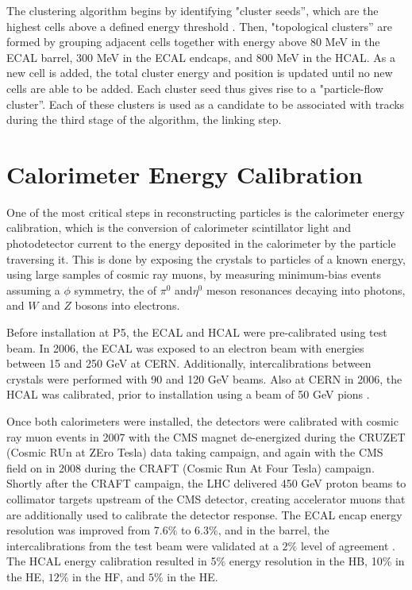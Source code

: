 \par The clustering algorithm begins by identifying "cluster seeds'',
which are the highest \PT cells above a defined energy threshold
\cite{CMS-PAS-PFT-09-001}.  Then, "topological clusters'' are formed
by grouping adjacent cells together with energy above 80 MeV in the
ECAL barrel, 300 MeV in the ECAL endcaps, and 800 MeV in the HCAL.
As a new cell is added, the total cluster energy and position is
updated until no new cells are able to be added.  Each cluster seed
thus gives rise to a "particle-flow cluster''.  Each of these clusters
is used as a candidate to be associated with tracks during the third
stage of the algorithm, the linking step.  


\section{Calorimeter Energy Calibration}
\label{energy_calibration_overview}

\par One of the most critical steps in reconstructing particles is the
calorimeter energy calibration, which is the conversion of calorimeter
scintillator light and photodetector current to the energy deposited
in the calorimeter by the particle traversing it.  This is done by
exposing the crystals to particles of a known energy, using large
samples of cosmic ray muons, by measuring minimum-bias events assuming
a $\phi$ symmetry, the of $\pi^{0}$ and$\eta^{0}$ meson resonances
decaying into photons, and $W$ and $Z$ bosons into electrons.   

\par Before installation at P5, the ECAL and HCAL were pre-calibrated
using test beam.  In 2006, the ECAL was exposed to an electron beam with
energies between 15 and 250 GeV \cite{Adzic:2008zza} at CERN.
Additionally, intercalibrations between crystals were performed with 90
and 120 GeV beams.  Also at CERN in 2006, the HCAL was calibrated,
prior to installation using a beam of 50 GeV pions
\cite{Cankocak:1127315}. 

\par Once both calorimeters were installed, the detectors were
calibrated with cosmic ray muon events in 2007 with the CMS magnet
de-energized during the CRUZET (Cosmic RUn at ZEro Tesla) data taking
campaign, and again with the CMS field on in 2008 during the CRAFT
(Cosmic Run At Four Tesla) campaign.  Shortly after the CRAFT
campaign, the LHC delivered 450 GeV proton beams to collimator targets
upstream of the CMS detector, creating accelerator muons that are
additionally used to calibrate the detector response.  The ECAL encap
energy resolution was improved from 7.6$\%$ to 6.3$\%$, and in the
barrel, the intercalibrations from the test beam were validated at a
$2\%$ level of agreement \cite{Malberti:1358839}.  The HCAL energy
calibration resulted in 5$\%$ energy resolution in the HB, 10$\%$ in
the HE, $12\%$ in the HF, and $5\%$ in the
HE\cite{Chatrchyan:1223950}.  

